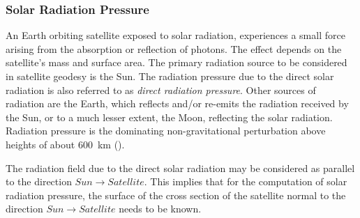 \subsubsection{Solar Radiation Pressure}\label{sssec:solar-radiation-pressure}

An Earth orbiting satellite exposed to solar radiation, experiences a small force
arising from the absorption or reflection of photons. The effect depends on the
satellite's mass and surface area. The primary radiation source to be considered 
in satellite geodesy is the Sun. The radiation pressure due to the direct solar 
radiation is also referred to as \emph{direct radiation pressure}. Other sources 
of radiation are the Earth, which reﬂects and/or re-emits the radiation received 
by the Sun, or to a much lesser extent, the Moon, reﬂecting the solar radiation. 
Radiation pressure is the dominating non-gravitational perturbation above heights 
of about \SI{600}{\km} (\cite{BeutlerVII}).

The radiation ﬁeld due to the direct solar radiation may be considered as
parallel to the direction \(Sun \to Satellite\). This implies that for the computation 
of solar radiation pressure, the surface of the cross section of the satellite 
normal to the direction \(Sun \to Satellite\) needs to be known.

